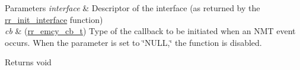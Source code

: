 \begin{DoxyParams}{Parameters}
{\em interface} & Descriptor of the interface (as returned by the \hyperlink{group___init_ga472a4890dcc7d7a13123c56a06946d91}{rr\+\_\+init\+\_\+interface} function) \\
\hline
{\em cb} & (\hyperlink{api_8h_a3850d8aa5bc177cb66b7638cafd30204}{rr\+\_\+emcy\+\_\+cb\+\_\+t}) Type of the callback to be initiated when an N\+MT event occurs. When the parameter is set to \char`\"{}\+N\+U\+L\+L,\char`\"{} the function is disabled. \\
\hline
\end{DoxyParams}
\begin{DoxyReturn}{Returns}
void 
\end{DoxyReturn}
